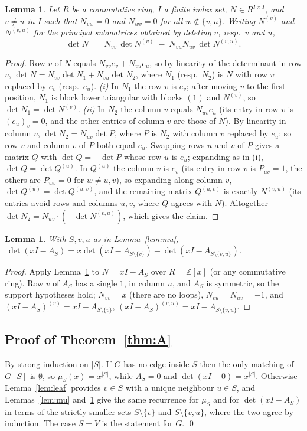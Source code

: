 \documentclass[11pt,a4paper]{article}
\newtheorem{lemma}[theorem]{Lemma}
\theoremstyle{definition}
\theoremstyle{remark}
\newcommand{\Z}{\mathbb{Z}}
\begin{document}
\begin{lemma}\label{lem:det}
Let $R$ be a commutative ring, $I$ a finite index set, $N\in R^{I\times I}$, and $v\ne u$ in $I$
such that $N_{vw}=0$ and $N_{wv}=0$ for all $w\notin\{v,u\}$. Writing $N^{(v)}$ and $N^{(v,u)}$
for the principal submatrices obtained by deleting $v$, resp.\ $v$ and $u$,
\[
  \det N \;=\; N_{vv}\,\det N^{(v)}\;-\;N_{vu}N_{uv}\,\det N^{(v,u)}.
\]
\end{lemma}
\begin{proof}
Row $v$ of $N$ equals $N_{vv}e_v+N_{vu}e_u$, so by linearity of the determinant in row $v$,
$\det N=N_{vv}\det N_1+N_{vu}\det N_2$, where $N_1$ (resp.\ $N_2$) is $N$ with row $v$ replaced by
$e_v$ (resp.\ $e_u$).
\emph{(i)} In $N_1$ the row $v$ is $e_v$; after moving $v$ to the first position, $N_1$ is block
lower triangular with blocks $(1)$ and $N^{(v)}$, so $\det N_1=\det N^{(v)}$.
\emph{(ii)} In $N_2$ the column $v$ equals $N_{uv}e_u$ (its entry in row $v$ is $(e_u)_v=0$, and
the other entries of column $v$ are those of $N$). By linearity in column $v$,
$\det N_2=N_{uv}\det P$, where $P$ is $N_2$ with column $v$ replaced by $e_u$; so row $v$ and
column $v$ of $P$ both equal $e_u$. Swapping rows $u$ and $v$ of $P$ gives a matrix $Q$ with
$\det Q=-\det P$ whose row $u$ is $e_u$; expanding as in (i), $\det Q=\det Q^{(u)}$. In $Q^{(u)}$
the column $v$ is $e_v$ (its entry in row $v$ is $P_{uv}=1$, the others are $P_{wv}=0$ for
$w\ne u,v$), so expanding along column $v$, $\det Q^{(u)}=\det Q^{(u,v)}$, and the remaining
matrix $Q^{(u,v)}$ is exactly $N^{(v,u)}$ (its entries avoid rows and columns $u,v$, where $Q$
agrees with $N$). Altogether $\det N_2=N_{uv}\cdot(-\det N^{(v,u)})$, which gives the claim.
\end{proof}

\begin{lemma}\label{lem:charp}
With $S,v,u$ as in Lemma~\ref{lem:mu},
$\ \det(xI-A_S)=x\det(xI-A_{S\setminus\{v\}})-\det(xI-A_{S\setminus\{v,u\}})$.
\end{lemma}
\begin{proof}
Apply Lemma~\ref{lem:det} to $N=xI-A_S$ over $R=\Z[x]$ (or any commutative ring). Row $v$ of
$A_S$ has a single $1$, in column $u$, and $A_S$ is symmetric, so the support hypotheses hold;
$N_{vv}=x$ (there are no loops), $N_{vu}=N_{uv}=-1$, and $(xI-A_S)^{(v)}=xI-A_{S\setminus\{v\}}$,
$(xI-A_S)^{(v,u)}=xI-A_{S\setminus\{v,u\}}$.
\end{proof}

\subsection{Proof of Theorem~\ref{thm:A}}
By strong induction on $|S|$. If $G$ has no edge inside $S$ then the only matching of $G[S]$ is
$\emptyset$, so $\mu_S(x)=x^{|S|}$, while $A_S=0$ and $\det(xI-0)=x^{|S|}$. Otherwise
Lemma~\ref{lem:leaf} provides $v\in S$ with a unique neighbour $u\in S$, and Lemmas~\ref{lem:mu}
and~\ref{lem:charp} give the same recurrence for $\mu_S$ and for $\det(xI-A_S)$ in terms of the
strictly smaller sets $S\setminus\{v\}$ and $S\setminus\{v,u\}$, where the two agree by induction.
The case $S=V$ is the statement for $G$. \qed
\end{document}
